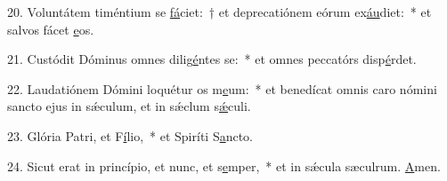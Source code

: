 20. Voluntátem timéntium se \uline{fá}ciet:~† et deprecatiónem eórum ex\uline{áu}diet:~* et salvos fácet \uline{e}os.\par 
21. Custódit Dóminus omnes dilig\uline{é}ntes se:~* et omnes peccatórs disp\uline{é}rdet.\par 
22. Laudatiónem Dómini loquétur os m\uline{e}um:~* et benedícat omnis caro nómini sancto ejus in sǽculum, et in sǽclum s\uline{ǽ}culi.\par 
23. Glória Patri, et F\uline{í}lio,~* et Spiríti S\uline{a}ncto.\par 
24. Sicut erat in princípio, et nunc, et s\uline{e}mper,~* et in sǽcula sæculrum. \uline{A}men.\par 
